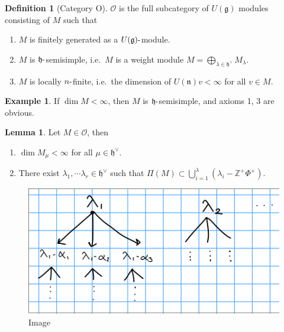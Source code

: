 \documentclass[11pt]{scrartcl}
\theoremstyle{definition}
\theoremstyle{theorem}
\newtheorem{lemma}[theorem]{Lemma}
\theoremstyle{proof}
\theoremstyle{definition}
\newtheorem{definition}{Definition}[theorem]
\theoremstyle{break}
\newtheorem{example}{Example}[section]
\theoremstyle{problem}
\providecommand{\tightlist}{%
  \setlength{\itemsep}{0pt}\setlength{\parskip}{0pt}}
\newcommand{\ZZ}[0]{{\mathbb{Z}}}
\newcommand{\dash}[0]{{\hbox{-}}}
\newcommand{\dual}[0]{^\vee}
\newcommand{\lieg}[0]{{\mathfrak{g}}}
\newcommand{\lieh}[0]{{\mathfrak{h}}}
\newcommand{\lien}[0]{{\mathfrak{n}}}
\newcommand{\OO}[0]{{\mathcal{O}}}
\newcommand{\union}[0]{\bigcup}
\begin{document}
\begin{definition}[Category O]

\(\mathcal O\) is the full subcategory of \(U(\lieg)\) modules
consisting of \(M\) such that

\begin{enumerate}
\def\labelenumi{\arabic{enumi}.}
\tightlist
\item
  \(M\) is finitely generated as a \(U(\lieg)\dash\)module.
\item
  \(M\) is \(\lieh\dash\)semisimple, i.e.~\(M\) is a weight module
  \(M = \bigoplus_{\lambda \in \lieh\dual} M_\lambda\).
\item
  \(M\) is locally \(n\dash\)finite, i.e.~the dimension of
  \(U(\lien) v < \infty\) for all \(v\in M\).
\end{enumerate}

\end{definition}

\begin{example}

If \(\dim M < \infty\), then \(M\) is \(\lieh\dash\)semisimple, and
axioms 1, 3 are obvious.\end{example}

\begin{lemma}

Let \(M \in \OO\), then

\begin{enumerate}
\def\labelenumi{\arabic{enumi}.}
\setcounter{enumi}{3}
\tightlist
\item
  \(\dim M_\mu < \infty\) for all \(\mu \in \lieh\dual\).
\item
  There exist \(\lambda_1, \cdots \lambda_r \in \lieh\dual\) such that
  \(\Pi(M) \subset \union_{i=1}^\lambda (\lambda_i - \ZZ^+ \Phi^+)\).
\end{enumerate}

\end{lemma}

\begin{figure}
\centering
\includegraphics{figures/2020-01-15-09:50.png}
\caption{Image}
\end{figure}
\end{document}
